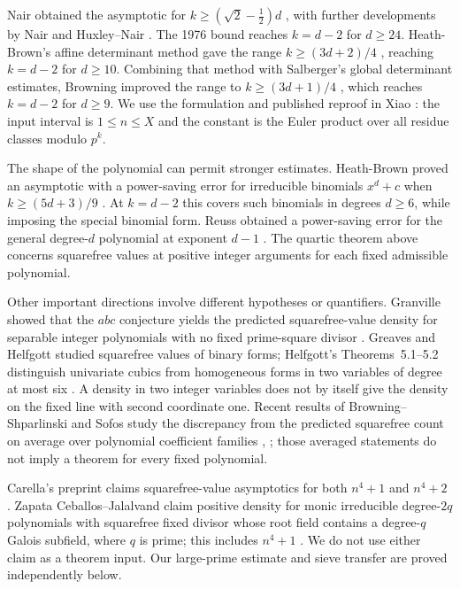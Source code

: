 Nair obtained the asymptotic for
$k\ge(\sqrt2-\tfrac12)d$ \cite{Nair1976}, with further developments
by Nair and Huxley--Nair \cite{Nair1979,HuxleyNair1980}.
The 1976 bound reaches $k=d-2$ for $d\ge24$.
Heath-Brown's affine determinant method gave the range
$k\ge(3d+2)/4$ \cite[Theorem~16]{HeathBrown2006Counting}, reaching
$k=d-2$ for $d\ge10$. Combining that method with Salberger's
global determinant estimates, Browning improved the range to
$k\ge(3d+1)/4$ \cite{Browning2011PowerFree}, which reaches
$k=d-2$ for $d\ge9$.
We use the formulation and published reproof in
Xiao \cite[Theorem~9.1 and Section~9]{Xiao2017PowerFree}:
the input interval is $1\le n\le X$ and the constant is the
Euler product over all residue classes modulo $p^k$.

The shape of the polynomial can permit stronger estimates.
Heath-Brown proved an asymptotic with a power-saving error for
irreducible binomials $x^d+c$ when $k\ge(5d+3)/9$
\cite[Theorem~1]{HeathBrown2013Powerfree}. At $k=d-2$ this covers
such binomials in degrees $d\ge6$, while imposing the special
binomial form. Reuss obtained a power-saving error for the general
degree-$d$ polynomial at exponent $d-1$
\cite[Theorem~2]{Reuss2015PowerFree}. The quartic theorem above
concerns squarefree values at positive integer arguments for each
fixed admissible polynomial.

Other important directions involve different hypotheses or
quantifiers. Granville showed that the $abc$ conjecture yields
the predicted squarefree-value density for separable integer
polynomials with no fixed prime-square divisor
\cite[Theorem~1]{granville1998abc}.
Greaves and Helfgott studied squarefree values of binary forms;
Helfgott's Theorems~5.1--5.2 distinguish univariate cubics from
homogeneous forms in two variables of degree at most six
\cite{Greaves1992,Helfgott2004}. A density in two integer variables
does not by itself give the density on the fixed line with second
coordinate one. Recent results of Browning--Shparlinski and Sofos
study the discrepancy from the predicted squarefree count on
average over polynomial coefficient families
\cite[Theorems~1.1--1.2]{BrowningShparlinski2024},
\cite[Theorem~1.1]{Sofos2026}; those averaged statements
do not imply a theorem for every fixed polynomial.

Carella's preprint claims squarefree-value asymptotics for both
$n^4+1$ and $n^4+2$ \cite[Theorems~1.1--1.2]{carella2023squarefree}.
Zapata Ceballos--Jalalvand claim positive density for monic
irreducible degree-$2q$ polynomials with squarefree fixed divisor
whose root field contains a degree-$q$ Galois subfield, where $q$
is prime; this includes $n^4+1$
\cite[Theorem~1.1]{zapataceballosjalalvand2026squarefree}.
We do not use either claim as a
theorem input. Our large-prime estimate and sieve transfer are
proved independently below.

